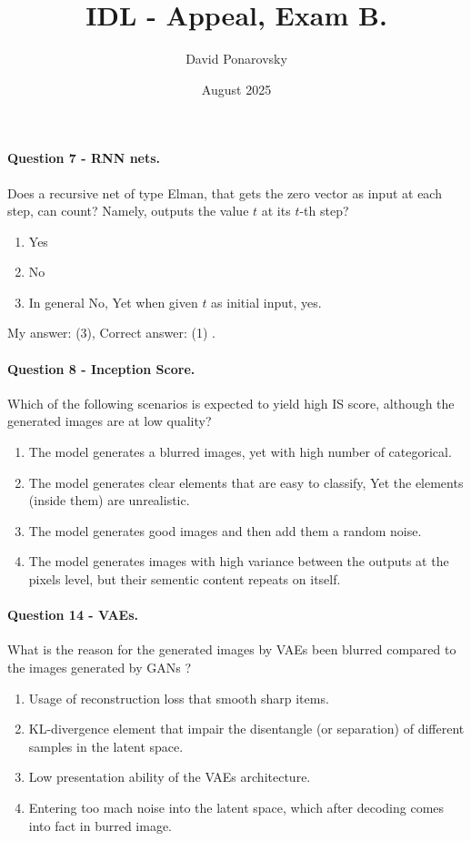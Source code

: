 \documentclass{article}
\title{IDL - Appeal, Exam B. }
\author{David Ponarovsky}
\date{August 2025}
\newcommand{\inb}[1]{ \color{blue}#1 \color{black} }
\begin{document}
\maketitle

\paragraph{ Question 7 - RNN nets.} 
Does a recursive net of type Elman, that gets the zero vector as input at each step, can count? Namely, outputs the value $t$ at its $t$-th step?
\begin{enumerate}
  \item Yes
  \item No
  \item In general No, Yet when given $t$ as initial input, yes. 
\end{enumerate}
\inb{ My answer: (3), Correct answer: (1)}. 
\paragraph{ Question 8 - Inception Score. } Which of the following scenarios is expected to yield high IS score, although the generated images are at low quality?
\begin{enumerate}
  \item The model generates a blurred images, yet with high number of categorical.  
  \item The model generates clear elements that are easy to classify, Yet the elements (inside them) are unrealistic. 
  \item The model generates good images and then add them a random noise. 
  \item The model generates images with high variance between the outputs at the pixels level, but their sementic content repeats on itself.    
\end{enumerate}
\paragraph{ Question 14 - VAEs. } What is the reason for the generated images by VAEs been blurred compared to the images generated by GANs ?   
\begin{enumerate}
  \item Usage of reconstruction loss that smooth sharp items.   
  \item  KL-divergence element that impair the disentangle (or separation) of different samples in the latent space. 
  \item Low presentation ability of the VAEs architecture. 
  \item Entering too mach noise into the latent space, which after decoding comes into fact in burred image. 

\end{enumerate}
\end{document}

